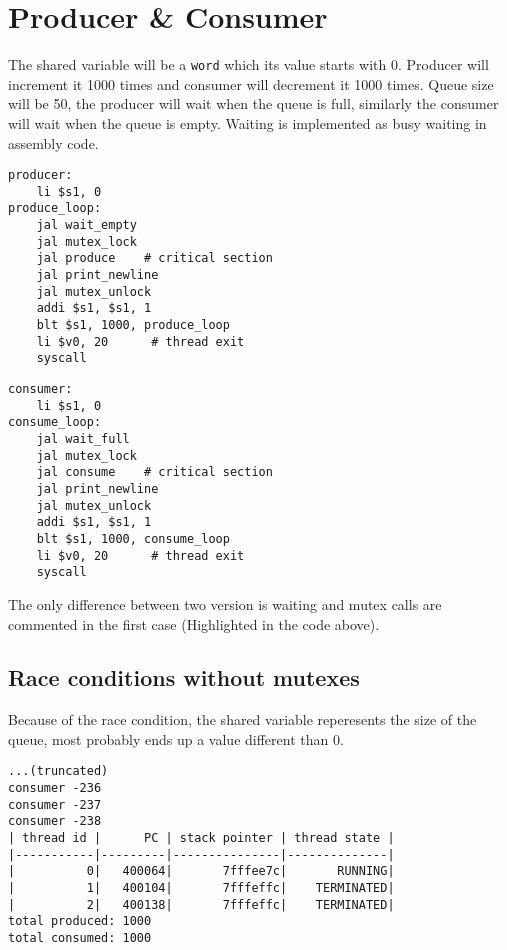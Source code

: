 \documentclass[a4paper]{article}
\begin{document}
\section*{Producer \& Consumer}
\label{sec:orga15987b}

The shared variable will be a \texttt{word} which its value starts with 0. Producer will increment it 1000 times and consumer will decrement it 1000 times. Queue size will be 50, the producer will wait when the queue is full, similarly the consumer will wait when the queue is empty. Waiting is implemented as busy waiting in assembly code.


\begin{multicols}{2}
\begin{verbatim}
producer:
    li $s1, 0
produce_loop:
    jal wait_empty
    jal mutex_lock
    jal produce    # critical section
    jal print_newline
    jal mutex_unlock
    addi $s1, $s1, 1
    blt $s1, 1000, produce_loop
    li $v0, 20      # thread exit
    syscall
\end{verbatim}
\begin{verbatim}
consumer:
    li $s1, 0
consume_loop:
    jal wait_full
    jal mutex_lock
    jal consume    # critical section
    jal print_newline
    jal mutex_unlock
    addi $s1, $s1, 1
    blt $s1, 1000, consume_loop
    li $v0, 20      # thread exit
    syscall
\end{verbatim}
\end{multicols}


The only difference between two version is waiting and mutex calls are commented in the first case (Highlighted in the code above).

\newpage

\subsection*{Race conditions without mutexes}
\label{sec:org4364e57}

Because of the race condition, the shared variable reperesents the size of the queue, most probably ends up a value different than 0.

 \begin{verbatim}
...(truncated)
consumer -236
consumer -237
consumer -238
| thread id |      PC | stack pointer | thread state |
|-----------|---------|---------------|--------------|
|          0|   400064|       7fffee7c|       RUNNING|
|          1|   400104|       7fffeffc|    TERMINATED|
|          2|   400138|       7fffeffc|    TERMINATED|
total produced: 1000
total consumed: 1000
\end{verbatim}
\end{document}
